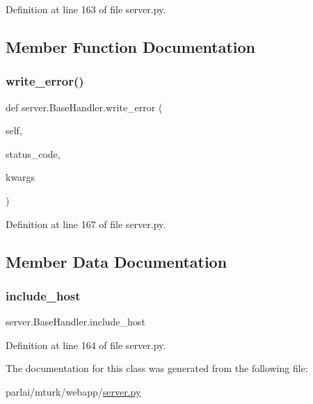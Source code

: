 Definition at line 163 of file server.\+py.



\subsection{Member Function Documentation}
\mbox{\label{classserver_1_1BaseHandler_a5f1d56408a328366fba10edc8ec94c40}} 
\subsubsection{\texorpdfstring{write\+\_\+error()}{write\_error()}}
{\footnotesize\ttfamily def server.\+Base\+Handler.\+write\+\_\+error (\begin{DoxyParamCaption}\item[{}]{self,  }\item[{}]{status\+\_\+code,  }\item[{}]{kwargs }\end{DoxyParamCaption})}



Definition at line 167 of file server.\+py.



\subsection{Member Data Documentation}
\mbox{\label{classserver_1_1BaseHandler_a065e62fa6c6fa62f2cdddb6b47d1d1cf}} 
\subsubsection{\texorpdfstring{include\+\_\+host}{include\_host}}
{\footnotesize\ttfamily server.\+Base\+Handler.\+include\+\_\+host}



Definition at line 164 of file server.\+py.



The documentation for this class was generated from the following file\+:\begin{DoxyCompactItemize}
\item 
parlai/mturk/webapp/\hyperlink{server_8py}{server.\+py}\end{DoxyCompactItemize}
